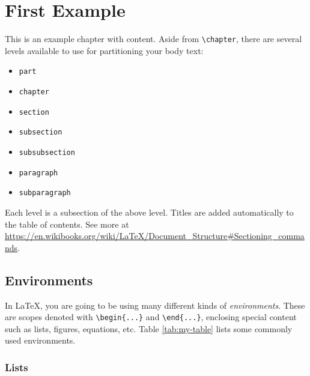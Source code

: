 
\chapter{First Example}
\label{ch:first-example}

This is an example chapter with content.
Aside from \verb!\chapter!, there are several levels available to use for partitioning your body text:
%
\begin{itemize}
\item \texttt{part}
\item \texttt{chapter}
\item \texttt{section}
\item \texttt{subsection}
\item \texttt{subsubsection}
\item \texttt{paragraph}
\item \texttt{subparagraph}
\end{itemize}
%
Each level is a subsection of the above level.
Titles are added automatically to the table of contents.
See more at \url{https://en.wikibooks.org/wiki/LaTeX/Document_Structure#Sectioning_commands}.


\section{Environments}
\label{sec:sec-within-chap}

In \LaTeX{}, you are going to be using many different kinds of \emph{environments}.
These are scopes denoted with \verb!\begin{...}! and \verb!\end{...}!, enclosing special content such as lists, figures, equations, etc.
Table \ref{tab:my-table} lists some commonly used environments.




\subsection{Lists}
\label{sec:lists}

